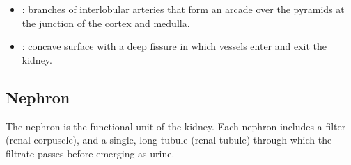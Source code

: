 \begin{multicols}{2}
\begin{itemize}
  \item {}:  branches of interlobular arteries that form an arcade over the pyramids at the junction of the cortex and medulla.
  
  \begin{center}
  \end{center}
  
  \item {}: concave surface with a deep fissure in which vessels enter and exit the kidney.
  
  \begin{center}
  \end{center}
\end{itemize}
\end{multicols}

\subsection{Nephron}
The nephron is the functional unit of the kidney. Each nephron includes a filter (renal corpuscle), and a single, long tubule (renal tubule) through which the filtrate passes before emerging as urine.

\begin{center}
\end{center}

